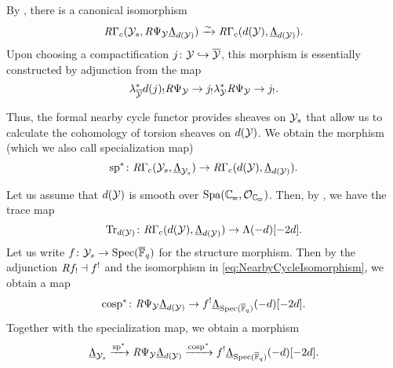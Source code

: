 \documentclass[../main.tex]{subfiles}
\begin{document}
By \cite[Theorem 5.7.6]{huber2013etale}, there is a canonical isomorphism
\begin{equation}\label{eq:NearbyCycleIsomorphism}
  \mathit R\Gamma_c(\mathcal{Y}_s, \mathit R\Psi_{\mathcal{Y}} \underline \Lambda_{d(\mathcal{Y})}) \xrightarrow{\sim} \mathit R\Gamma_c
  (d(\mathcal{Y}), \underline \Lambda_{d(\mathcal{Y})}).
\end{equation}
Upon choosing a compactification $j \colon \mathcal{Y} \hookrightarrow \overline {\mathcal{Y}}$, 
this morphism is essentially constructed by adjunction from the map
\begin{equation*}
    \lambda^*_{\overline {\mathcal{Y}}} d(j)_! \mathit R \Psi_{\mathcal{Y}}
    \to j_! \lambda_{\mathcal{Y}}^* \mathit R \Psi_{\mathcal{Y}}
    \to j_!.
\end{equation*}

Thus, the formal nearby cycle functor provides sheaves on $\mathcal{Y}_s$ that allow us to calculate the cohomology of torsion sheaves on $d(\mathcal{Y})$. We obtain the morphism (which we also call specialization map)
\begin{equation*}
  \mathrm{sp}^*\colon \mathit R\Gamma_c(\mathcal{Y}_s, \underline \Lambda_{\mathcal{Y}_s}) \to \mathit R
  \Gamma_c(d(\mathcal{Y}), \underline \Lambda_{d(\mathcal{Y})}).
\end{equation*}

Let us assume that $d(\mathcal{Y})$ is smooth over $\Spa(\Cp, \cO_\Cp)$. Then, by
\cite[Theorem 7.3.4]{huber2013etale}, we have the trace map
\begin{equation*}
  \operatorname{Tr}_{d(\mathcal{Y})} \colon \mathit R  \Gamma_c( d(\mathcal{Y}), \underline \Lambda_{d(\mathcal{Y})} ) \to 
  \Lambda (-d)[-2d].
\end{equation*}
Let us write $f \colon \mathcal{Y}_s \to \operatorname{Spec}({\overline {\mathbb{F}}_q})$ for the structure morphism. Then by the
adjunction $\mathit R f_! \dashv f^!$ and the isomorphism in \eqref{eq:NearbyCycleIsomorphism},
we obtain a map
\begin{equation*}
  \mathrm{cosp}^* \colon \mathit R\Psi_{\mathcal{Y}} \underline\Lambda_{d(\mathcal{Y})} \to f^!
  \underline\Lambda_{\operatorname{Spec}({\overline {\mathbb{F}}_q})}(-d)[-2d].
\end{equation*}
Together with the specialization map, we obtain a morphism
\begin{equation*}
  \underline \Lambda_{\mathcal{Y}_s} \xrightarrow{\mathrm{sp}^*} \mathit R\Psi_{\mathcal{Y}} \underline\Lambda_{d(\mathcal{Y})} 
  \xrightarrow{\mathrm{cosp}^*} f^! \underline\Lambda_{\operatorname{Spec}({\overline {\mathbb{F}}_q})}(-d)[-2d].
\end{equation*}
\end{document}
